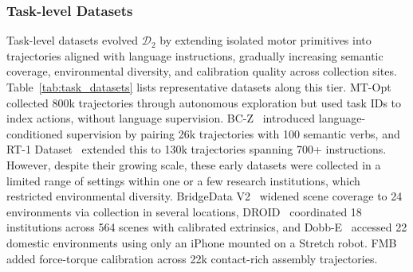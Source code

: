 \documentclass[acmsmall,screen,review]{acmart}
\begin{document}
\subsubsection{Task-level Datasets}\label{sec:task_datasets_narrative}

Task-level datasets evolved \(\mathcal{D}_2\) by extending isolated motor primitives into trajectories aligned with language instructions, gradually increasing semantic coverage, environmental diversity, and calibration quality across collection sites. 
Table~\ref{tab:task_datasets} lists representative datasets along this tier.
MT-Opt~\cite{kalashnikov2021mt} collected 800k trajectories through autonomous exploration but used task IDs to index actions, without language supervision. 
BC-Z~\cite{jang2022bc} introduced language-conditioned supervision by pairing 26k trajectories with 100 semantic verbs, and RT-1 Dataset~\cite{brohan2023rt1} extended this to 130k trajectories spanning 700+ instructions. 
However, despite their growing scale, these early datasets were collected in a limited range of settings within one or a few research institutions, which restricted environmental diversity.
BridgeData V2~\cite{walke2024bridgedatav2} widened scene coverage to 24 environments via collection in several locations, 
DROID~\cite{khazatsky2024droid} coordinated 18 institutions across 564 scenes with calibrated extrinsics, 
and Dobb-E~\cite{shafiullah2023bringing} accessed 22 domestic environments using only an iPhone mounted on a Stretch robot. 
FMB~\cite{fu2025fmb} added force-torque calibration across 22k contact-rich assembly trajectories. 
\end{document}
